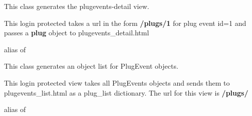 \documentclass[letterpaper,10pt,english]{sphinxmanual}
\begin{document}
\begin{fulllineitems}
\label{timed_mating:mousedb.timed_mating.views.PlugEventsDetail}
This class generates the plugevents-detail view.

This login protected takes a url in the form \textbf{/plugs/1} for plug event id=1 and passes a \textbf{plug} object to plugevents\_detail.html

\begin{fulllineitems}
\label{timed_mating:mousedb.timed_mating.views.PlugEventsDetail.model}
alias of 

\end{fulllineitems}


\end{fulllineitems}


\begin{fulllineitems}
\label{timed_mating:mousedb.timed_mating.views.PlugEventsList}
This class generates an object list for PlugEvent objects.

This login protected view takes all PlugEvents objects and sends them to plugevents\_list.html as a plug\_list dictionary.
The url for this view is \textbf{/plugs/}

\begin{fulllineitems}
\label{timed_mating:mousedb.timed_mating.views.PlugEventsList.model}
alias of 

\end{fulllineitems}


\end{fulllineitems}

\end{document}
